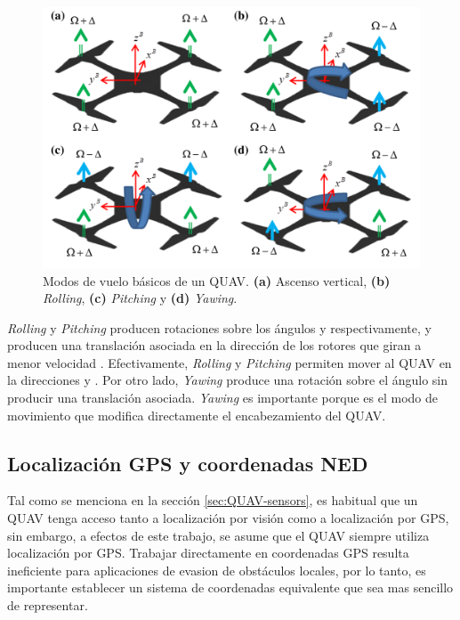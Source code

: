 \begin{figure}[H]
    \centering
    \includegraphics[scale=0.3]{partes/ImgJoao/QUAV-modes.png}
    \caption[Modos de vuelo básicos de un QUAV.]{Modos de vuelo básicos de un QUAV\footnotemark. \textbf{(a)} Ascenso vertical, \textbf{(b)} \textit{Rolling}, \textbf{(c)} \textit{Pitching} y \textbf{(d)} \textit{Yawing}.} 
    \label{fig:QUAV-modes}
\end{figure}

\textit{Rolling} y \textit{Pitching} producen rotaciones sobre los ángulos \jim{\phi} y \jim{\theta} respectivamente, y producen una translación asociada en la dirección de los rotores que giran a menor velocidad \jim{\Omega - \Delta}. Efectivamente, \textit{Rolling} y \textit{Pitching} permiten mover al QUAV en la direcciones  y . Por otro lado, \textit{Yawing} produce una rotación sobre el ángulo \jim{\psi} sin producir una translación asociada. \textit{Yawing} es importante porque es el modo de movimiento que modifica directamente el encabezamiento del QUAV.

\subsection{Localización GPS y coordenadas NED}

Tal como se menciona en la sección \ref{sec:QUAV-sensors}, es habitual que un QUAV tenga acceso tanto a localización por visión como a localización por GPS, sin embargo, a efectos de este trabajo, se asume que el QUAV siempre utiliza localización por GPS. Trabajar directamente en coordenadas GPS resulta ineficiente para aplicaciones de evasion de obstáculos locales, por lo tanto, es importante establecer un sistema de coordenadas equivalente que sea mas sencillo de representar.

